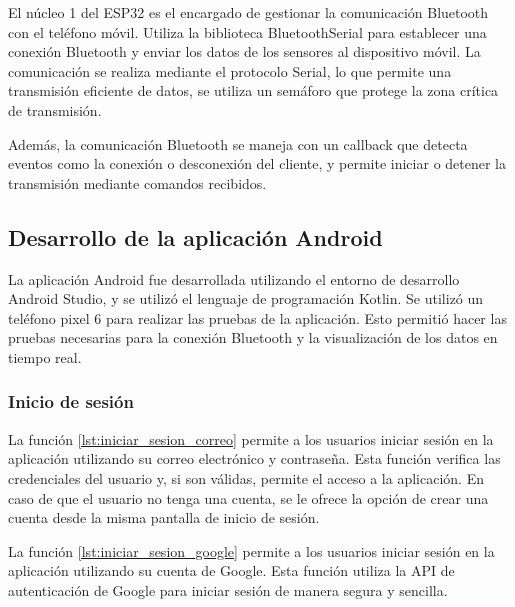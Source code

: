         El núcleo 1 del ESP32 es el encargado de gestionar la comunicación Bluetooth con el teléfono móvil. Utiliza la biblioteca BluetoothSerial para establecer una conexión Bluetooth y enviar los datos de los sensores al dispositivo móvil. La comunicación se realiza mediante el protocolo Serial, lo que permite una transmisión eficiente de datos,  se utiliza un semáforo que protege la zona crítica de transmisión.

        Además, la comunicación Bluetooth se maneja con un callback que detecta eventos como la conexión o desconexión del cliente, y permite iniciar o detener la transmisión mediante comandos recibidos.

        

    \subsection{Desarrollo de la aplicación Android}

        La aplicación Android fue desarrollada utilizando el entorno de desarrollo Android Studio, y se utilizó el lenguaje de programación Kotlin. Se utilizó un teléfono pixel 6 para realizar las pruebas de la aplicación. Esto permitió hacer las pruebas necesarias para la conexión Bluetooth y la visualización de los datos en tiempo real.

        \subsubsection{Inicio de sesión}

        La función \ref{lst:iniciar_sesion_correo} permite a los usuarios iniciar sesión en la aplicación utilizando su correo electrónico y contraseña. Esta función verifica las credenciales del usuario y, si son válidas, permite el acceso a la aplicación. En caso de que el usuario no tenga una cuenta, se le ofrece la opción de crear una cuenta desde la misma pantalla de inicio de sesión.

        

        La función \ref{lst:iniciar_sesion_google} permite a los usuarios iniciar sesión en la aplicación utilizando su cuenta de Google. Esta función utiliza la API de autenticación de Google para iniciar sesión de manera segura y sencilla.
        
